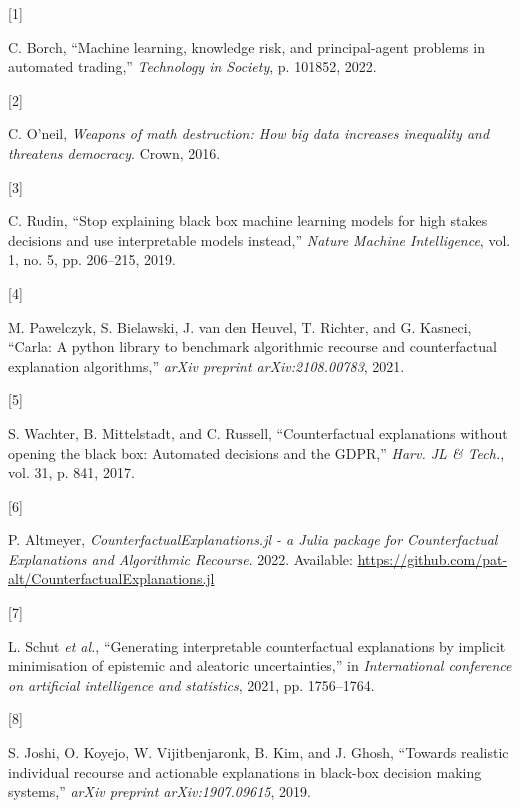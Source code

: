 \documentclass[
  conference]{IEEEtran}
\newlength{\cslhangindent}
\newlength{\csllabelwidth}
\newlength{\cslentryspacingunit} %
\newenvironment{CSLReferences}[2] %
 {%
  \setlength{\parindent}{0pt}
  \ifodd #1
  \let\oldpar\par
  \def\par{\hangindent=\cslhangindent\oldpar}
  \fi
  \setlength{\parskip}{#2\cslentryspacingunit}
 }%
 {}
\newcommand{\CSLLeftMargin}[1]{\parbox[t]{\csllabelwidth}{#1}}
\newcommand{\CSLRightInline}[1]{\parbox[t]{\linewidth - \csllabelwidth}{#1}\break}
\begin{document}
\hypertarget{refs}{}
\begin{CSLReferences}{0}{0}
\leavevmode{}%
\CSLLeftMargin{{[}1{]} }%
\CSLRightInline{C. Borch, {``Machine learning, knowledge risk, and
principal-agent problems in automated trading,''} \emph{Technology in
Society}, p. 101852, 2022.}

\leavevmode{}%
\CSLLeftMargin{{[}2{]} }%
\CSLRightInline{C. O'neil, \emph{Weapons of math destruction: How big
data increases inequality and threatens democracy}. Crown, 2016.}

\leavevmode{}%
\CSLLeftMargin{{[}3{]} }%
\CSLRightInline{C. Rudin, {``Stop explaining black box machine learning
models for high stakes decisions and use interpretable models
instead,''} \emph{Nature Machine Intelligence}, vol. 1, no. 5, pp.
206--215, 2019.}

\leavevmode{}%
\CSLLeftMargin{{[}4{]} }%
\CSLRightInline{M. Pawelczyk, S. Bielawski, J. van den Heuvel, T.
Richter, and G. Kasneci, {``Carla: A python library to benchmark
algorithmic recourse and counterfactual explanation algorithms,''}
\emph{arXiv preprint arXiv:2108.00783}, 2021.}

\leavevmode{}%
\CSLLeftMargin{{[}5{]} }%
\CSLRightInline{S. Wachter, B. Mittelstadt, and C. Russell,
{``Counterfactual explanations without opening the black box: Automated
decisions and the GDPR,''} \emph{Harv. JL \& Tech.}, vol. 31, p. 841,
2017.}

\leavevmode{}%
\CSLLeftMargin{{[}6{]} }%
\CSLRightInline{P. Altmeyer, \emph{{CounterfactualExplanations.jl - a
Julia package for Counterfactual Explanations and Algorithmic
Recourse}}. 2022. Available:
\url{https://github.com/pat-alt/CounterfactualExplanations.jl}}

\leavevmode{}%
\CSLLeftMargin{{[}7{]} }%
\CSLRightInline{L. Schut \emph{et al.}, {``Generating interpretable
counterfactual explanations by implicit minimisation of epistemic and
aleatoric uncertainties,''} in \emph{International conference on
artificial intelligence and statistics}, 2021, pp. 1756--1764.}

\leavevmode{}%
\CSLLeftMargin{{[}8{]} }%
\CSLRightInline{S. Joshi, O. Koyejo, W. Vijitbenjaronk, B. Kim, and J.
Ghosh, {``Towards realistic individual recourse and actionable
explanations in black-box decision making systems,''} \emph{arXiv
preprint arXiv:1907.09615}, 2019.}


\end{CSLReferences}
\end{document}
